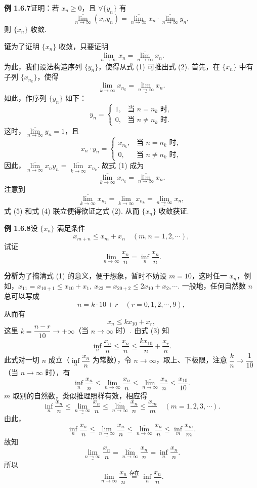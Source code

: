 \documentclass[UTF8,12pt,a4paper,fontset=fandol]{ctexart}
\begin{document}
\noindent\textbf{例 1.6.7}\quad 证明：若 $x_n\ge0$，且 $\forall\{y_n\}$ 有
\[
  \overline{\lim_{n\to\infty}}(x_ny_n)
  =\overline{\lim_{n\to\infty}}x_n\cdot\overline{\lim_{n\to\infty}}y_n,
\tag{1}
\]
则 $\{x_n\}$ 收敛.

\noindent\textbf{证}\quad 为了证明 $\{x_n\}$ 收敛，只要证明
\[
  \lim_{n\to\infty}x_n=\overline{\lim_{n\to\infty}}x_n.
\tag{2}
\]
为此，我们设法构造序列 $\{y_n\}$，使得从式 (1) 可推出式 (2). 首先，在 $\{x_n\}$ 中有子列 $\{x_{n_k}\}$，使得
\[
  \lim_{k\to\infty}x_{n_k}=\underline{\lim_{n\to\infty}}x_n.
\tag{3}
\]
如此，作序列 $\{y_n\}$ 如下：
\[
  y_n=
  \begin{cases}
    1, & \text{当 }n=n_k\text{ 时},\\
    0, & \text{当 }n\ne n_k\text{ 时}.
  \end{cases}
\]
这时，$\overline{\lim\limits_{n\to\infty}}y_n=1$，且
\[
  x_n\cdot y_n=
  \begin{cases}
    x_{n_k}, & \text{当 }n=n_k\text{ 时},\\
    0, & \text{当 }n\ne n_k\text{ 时},
  \end{cases}
\]
因此，$\overline{\lim\limits_{n\to\infty}}x_ny_n=\overline{\lim\limits_{k\to\infty}}x_{n_k}$. 故式 (1) 成为
\[
  \overline{\lim_{k\to\infty}}x_{n_k}
  =\overline{\lim_{n\to\infty}}x_n.
\tag{4}
\]
注意到
\[
  \overline{\lim_{k\to\infty}}x_{n_k}
  =\lim_{k\to\infty}x_{n_k}
  =\underline{\lim_{n\to\infty}}x_n,
\tag{5}
\]
式 (5) 和式 (4) 联立便得欲证之式 (2). 从而 $\{x_n\}$ 收敛获证.

\noindent\textbf{例 1.6.8}\quad 设 $\{x_n\}$ 满足条件
\[
  x_{m+n}\le x_m+x_n\quad(m,n=1,2,\cdots),
\tag{1}
\]
试证
\[
  \lim_{n\to\infty}\frac{x_n}{n}=\inf_n\frac{x_n}{n}.
\]

\noindent\textbf{分析}\quad 为了搞清式 (1) 的意义，便于想象，暂时不妨设 $m=10$，这时任一 $x_n$，例如，$x_{11}=x_{10+1}\le x_{10}+x_1,\ x_{22}=x_{20+2}\le2x_{10}+x_2,\cdots$. 一般地，任何自然数 $n$ 总可以写成
\[
  n=k\cdot10+r\quad(r=0,1,2,\cdots,9),
\tag{2}
\]
从而有
\[
  x_n\le kx_{10}+x_r,
\tag{3}
\]
这里 $k=\dfrac{n-r}{10}\to+\infty$（当 $n\to\infty$ 时）. 由式 (3) 知
\[
  \inf_n\frac{x_n}{n}\le \frac{x_n}{n}\le \frac{kx_{10}}{n}+\frac{x_r}{n}.
\]
此式对一切 $n$ 成立（$\inf\limits_n\dfrac{x_n}{n}$ 为常数），令 $n\to\infty$，取上、下极限，注意 $\dfrac{k}{n}\to\dfrac1{10}$（当 $n\to\infty$ 时），有
\[
  \inf_n\frac{x_n}{n}\le \underline{\lim_{n\to\infty}}\frac{x_n}{n}
  \le \overline{\lim_{n\to\infty}}\frac{x_n}{n}\le \frac{x_{10}}{10}.
\]
$m$ 取别的自然数，类似推理照样有效，相应得
\[
  \inf_n\frac{x_n}{n}\le \underline{\lim_{n\to\infty}}\frac{x_n}{n}
  \le \overline{\lim_{n\to\infty}}\frac{x_n}{n}\le \frac{x_m}{m}\quad(m=1,2,3,\cdots).
\]
由此，
\[
  \inf_n\frac{x_n}{n}\le \underline{\lim_{n\to\infty}}\frac{x_n}{n}
  \le \overline{\lim_{n\to\infty}}\frac{x_n}{n}\le \inf_m\frac{x_m}{m}.
\]
故知
\[
  \underline{\lim_{n\to\infty}}\frac{x_n}{n}
  =\overline{\lim_{n\to\infty}}\frac{x_n}{n}
  =\inf_n\frac{x_n}{n}.
\]
所以
\[
  \lim_{n\to\infty}\frac{x_n}{n}\overset{\text{存在}}{=}\inf_n\frac{x_n}{n}.
\]
\end{document}

